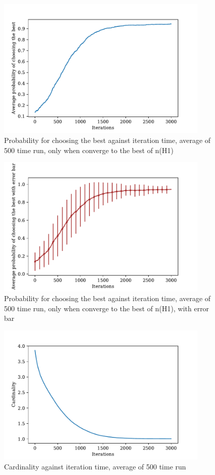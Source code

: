 \documentclass[a4paper,12pt]{article}
\begin{document}
	\begin{figure}[H]
		\centering
		\includegraphics[width=0.9\textwidth]{correct_pbestnorm1_200_3000_500}
		\caption{Probability for choosing the best against iteration time, average of 500 time run, only when converge to the best of n(H1)}\label{correct_pbestnorm1_200_3000_500}
	\end{figure}
	\begin{figure}[H]
		\centering
		\includegraphics[width=0.9\textwidth]{correct_pbest_errbarnorm1_200_3000_500}
		\caption{Probability for choosing the best against iteration time, average of 500 time run, only when converge to the best of n(H1), with error bar}\label{correct_pbest_errbarnorm1_200_3000_500}
	\end{figure}
	\begin{figure}[H]
		\centering
		\includegraphics[width=0.9\textwidth]{cardnorm1_200_3000_500}
		\caption{Cardinality against iteration time, average of 500 time run}\label{cardnorm1_200_3000_500}
	\end{figure}
\end{document}
